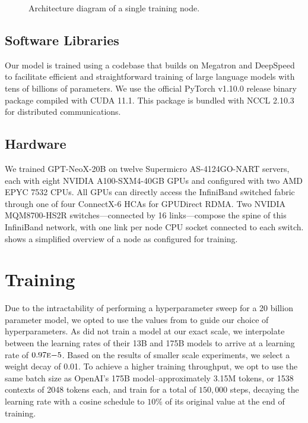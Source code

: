 \documentclass[11pt]{article}
\newcommand{\model}{GPT-NeoX-20B}
\begin{document}
\begin{figure}[hbt]
    \centering
    
    \caption{Architecture diagram of a single training node.}
    \label{fig:training-node}
\end{figure}


\subsection{Software Libraries}
\label{subsec:software}

Our model is trained using a codebase that builds on Megatron \citep{shoeybi2020megatronlm} and DeepSpeed \citep{rasley2020deepspeed} to facilitate efficient and straightforward training of large language models with tens of billions of parameters. We use the official PyTorch v1.10.0 release binary package compiled with CUDA 11.1. This package is bundled with NCCL 2.10.3 for distributed communications.

\subsection{Hardware}
\label{subsec:hardware}

We trained \model{} on twelve Supermicro AS-4124GO-NART servers, each with eight NVIDIA A100-SXM4-40GB GPUs and configured with two AMD EPYC 7532 CPUs. All GPUs can directly access the InfiniBand switched fabric through one of four ConnectX-6 HCAs for GPUDirect RDMA. Two NVIDIA MQM8700-HS2R switches---connected by 16 links---compose the spine of this InfiniBand network, with one link per node CPU socket connected to each switch.  shows a simplified overview of a node as configured for training.

\section{Training}

Due to the intractability of performing a hyperparameter sweep for a 20 billion parameter model, we opted to use the values from \citet{brown2020language} to guide our choice of hyperparameters. As \citet{brown2020language} did not train a model at our exact scale, we interpolate between the learning rates of their 13B and 175B models to arrive at a learning rate of $0.97\mathrm{\textsc{e}}{-5}$. Based on the results of smaller scale experiments, we select a weight decay of 0.01. To achieve a higher training throughput, we opt to use the same batch size as OpenAI's 175B model--approximately 3.15M tokens, or 1538 contexts of 2048 tokens each, and train for a total of $150,000$ steps, decaying the learning rate with a cosine schedule to $10\%$ of its original value at the end of training.
\end{document}

